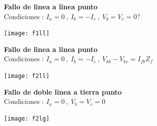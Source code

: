 \documentclass[11pt,a4paper,twocolumn]{article}
\begin{document}
\begin{cajita}

	\textbf{Fallo de linea a linea punto}\\
	Condiciones : $I_{a}=0~,~ I_{b}=-I_{c}~,~V_{b}=V_{c}=0? $
	\begin{center}
		\vspace{-0.2cm}
		\texttt{[image: f1ll]}\\
	\end{center}
	\textbf{Fallo de linea a linea punto}\\
	Condiciones : $I_{a}=0~,~ I_{b}=-I_{c}~,~V_{kb}-V_{kc}=I_{fb}Z_{f} $
	\begin{center}
		\vspace{-0.2cm}
		\texttt{[image: f2ll]}\\
	\end{center}

	\textbf{Fallo de doble linea a tierra punto}\\
	Condiciones : $I_{a}=0~,~ V_{b}=V_{c}=0~ $
	\begin{center}
		\vspace{-0.2cm}
		\texttt{[image: f2lg]}\\
	\end{center}
\end{cajita}
\end{document}
